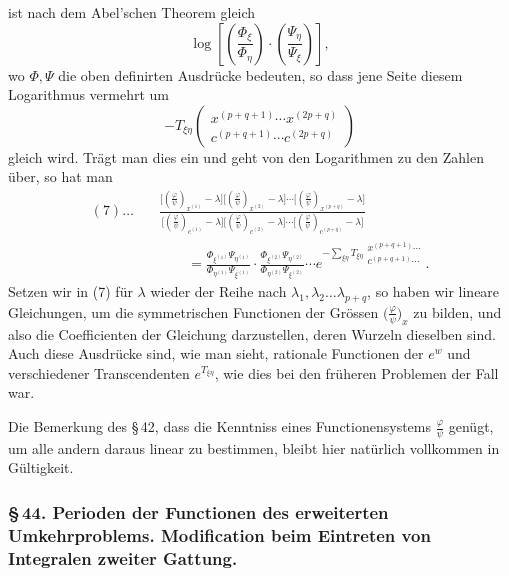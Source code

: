 \documentclass[10pt]{article}
\begin{document}
ist nach dem Abel'schen Theorem gleich
\[
\log\left[\left(\frac{\Phi_\xi}{\Phi_\eta}\right)\cdot\left(\frac{\Psi_\eta}{\Psi_\xi}\right)\right],
\]
wo \(\Phi,\Psi\) die oben definirten Ausdrücke bedeuten, so dass jene Seite diesem Logarithmus vermehrt um
\[
-T_{\xi\eta}\begin{pmatrix}x^{(p+q+1)}\cdots x^{(2p+q)}\\c^{(p+q+1)}\cdots c^{(2p+q)}\end{pmatrix}
\]
gleich wird. Trägt man dies ein und geht von den Logarithmen zu den Zahlen über, so hat man
\begingroup\footnotesize
\[
\begin{aligned}
(7)\ldots\quad
&\frac{\bigl[(\frac{\varphi}{\psi})_{x^{(1)}}-\lambda\bigr]
\bigl[(\frac{\varphi}{\psi})_{x^{(2)}}-\lambda\bigr]\cdots
\bigl[(\frac{\varphi}{\psi})_{x^{(p+q)}}-\lambda\bigr]}
{\bigl[(\frac{\varphi}{\psi})_{c^{(1)}}-\lambda\bigr]
\bigl[(\frac{\varphi}{\psi})_{c^{(2)}}-\lambda\bigr]\cdots
\bigl[(\frac{\varphi}{\psi})_{c^{(p+q)}}-\lambda\bigr]}\\
&\qquad=\frac{\Phi_{\xi^{(1)}}\Psi_{\eta^{(1)}}}{\Phi_{\eta^{(1)}}\Psi_{\xi^{(1)}}}\cdot
\frac{\Phi_{\xi^{(2)}}\Psi_{\eta^{(2)}}}{\Phi_{\eta^{(2)}}\Psi_{\xi^{(2)}}}\cdots
 e^{-\sum_{\xi\eta}T_{\xi\eta}\begin{smallmatrix}x^{(p+q+1)}\cdots\\c^{(p+q+1)}\cdots\end{smallmatrix}}.
\end{aligned}
\]
\endgroup
Setzen wir in (7) für \(\lambda\) wieder der Reihe nach \(\lambda_1,\lambda_2\ldots\lambda_{p+q}\), so haben wir lineare Gleichungen, um die symmetrischen Functionen der Grössen \(\bigl(\frac{\varphi}{\psi}\bigr)_x\) zu bilden, und also die Coefficienten der Gleichung darzustellen, deren Wurzeln dieselben sind. Auch diese Ausdrücke sind, wie man sieht, rationale Functionen der \(e^w\) und verschiedener Transcendenten \(e^{T_{\xi\eta}}\), wie dies bei den früheren Problemen der Fall war.

Die Bemerkung des \S\,42, dass die Kenntniss eines Functionensystems \(\frac{\varphi}{\psi}\) genügt, um alle andern daraus linear zu bestimmen, bleibt hier natürlich vollkommen in Gültigkeit.

\subsubsection*{\S\,44. Perioden der Functionen des erweiterten Umkehrproblems. Modification beim Eintreten von Integralen zweiter Gattung.}
\end{document}
